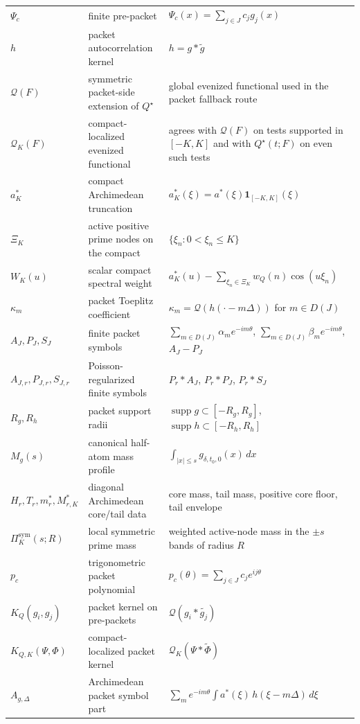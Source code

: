 \begin{table}[h]
\begin{tabular}{lll}
$\Psi_c$ & finite pre-packet & $\Psi_c(x)=\sum_{j\in J} c_j g_j(x)$ \\
$h$ & packet autocorrelation kernel & $h=g*\widetilde g$ \\
$\mathcal Q(F)$ & symmetric packet-side extension of $Q^\star$ & global evenized functional used in the packet fallback route \\
$\mathcal Q_K(F)$ & compact-localized evenized functional & agrees with $\mathcal Q(F)$ on tests supported in $[-K,K]$ and with $Q^\star(t;F)$ on even such tests \\
$a_K^*$ & compact Archimedean truncation & $a_K^*(\xi)=a^*(\xi)\mathbf 1_{[-K,K]}(\xi)$ \\
$\Xi_K$ & active positive prime nodes on the compact & $\{\xi_n:0<\xi_n\le K\}$ \\
$W_K(u)$ & scalar compact spectral weight & $\widehat{a_K^*}(u)-\sum_{\xi_n\in\Xi_K} w_Q(n)\cos(u\xi_n)$ \\
$\kappa_m$ & packet Toeplitz coefficient & $\kappa_m=\mathcal Q(h(\cdot-m\Delta))$ for $m\in D(J)$ \\
$A_J,P_J,S_J$ & finite packet symbols & $\sum_{m\in D(J)} \alpha_m e^{-im\theta}$, $\sum_{m\in D(J)} \beta_m e^{-im\theta}$, $A_J-P_J$ \\
$A_{J,r},P_{J,r},S_{J,r}$ & Poisson-regularized finite symbols & $P_r*A_J$, $P_r*P_J$, $P_r*S_J$ \\
$R_g,R_h$ & packet support radii & $\operatorname{supp}g\subset[-R_g,R_g]$, $\operatorname{supp}h\subset[-R_h,R_h]$ \\
$M_g(s)$ & canonical half-atom mass profile & $\int_{|x|\le s} g_{\delta,t_0,0}(x)\,dx$ \\
$H_r,T_r,m_r^*,M_{r,K}^*$ & diagonal Archimedean core/tail data & core mass, tail mass, positive core floor, tail envelope \\
$\Pi_K^{\mathrm{sym}}(s;R)$ & local symmetric prime mass & weighted active-node mass in the $\pm s$ bands of radius $R$ \\
$p_c$ & trigonometric packet polynomial & $p_c(\theta)=\sum_{j\in J} c_j e^{ij\theta}$ \\
$K_Q(g_i,g_j)$ & packet kernel on pre-packets & $\mathcal Q(g_i * \widetilde{g_j})$ \\
$K_{Q,K}(\Psi,\Phi)$ & compact-localized packet kernel & $\mathcal Q_K(\Psi * \widetilde{\Phi})$ \\
$A_{g,\Delta}$ & Archimedean packet symbol part & $\sum_m e^{-im\theta}\int a^*(\xi)\,h(\xi-m\Delta)\,d\xi$ \\

\end{tabular}
\end{table}
